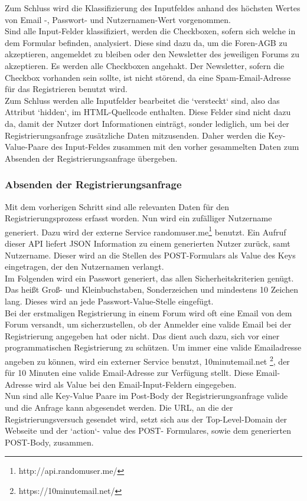Zum Schluss wird die Klassifizierung des Inputfeldes anhand des höchsten Wertes von Email -, Passwort- und Nutzernamen-Wert vorgenommen. \\
Sind alle Input-Felder klassifiziert, werden die Checkboxen, sofern sich welche in dem Formular befinden, analysiert. Diese sind dazu da, um die Foren-AGB zu akzeptieren, angemeldet zu bleiben oder den Newsletter des jeweiligen Forums zu akzeptieren.
Es werden alle Checkboxen angehakt. Der Newsletter, sofern die Checkbox vorhanden sein sollte, ist nicht störend, da eine Spam-Email-Adresse für das Registrieren benutzt wird.\\
Zum Schluss werden alle Inputfelder bearbeitet die `versteckt` sind, also das Attribut `hidden`, im HTML-Quellcode enthalten.
Diese Felder sind nicht dazu da, damit der Nutzer dort Informationen einträgt, sonder lediglich, um bei der Registrierungsanfrage zusätzliche Daten mitzusenden. Daher werden die Key-Value-Paare des Input-Feldes zusammen mit den vorher gesammelten Daten zum Absenden der Registrierungsanfrage übergeben.

\subsubsection{Absenden der Registrierungsanfrage}
Mit dem vorherigen Schritt sind alle relevanten Daten für den Registrierungsprozess erfasst worden. Nun wird ein zufälliger Nutzername generiert. Dazu wird der externe Service randomuser.me\footnote{http://api.randomuser.me/} benutzt. Ein Aufruf dieser API liefert JSON Information zu einem generierten Nutzer zurück, samt Nutzername. Dieser wird an die Stellen des POST-Formulars als Value des Keys eingetragen, der den Nutzernamen verlangt.\\
Im Folgenden wird ein Passwort generiert, das allen Sicherheitskriterien genügt. Das heißt Groß- und Kleinbuchstaben, Sonderzeichen und mindestens 10 Zeichen lang. Dieses wird an jede Passwort-Value-Stelle eingefügt.\\
Bei der erstmaligen Registrierung in einem Forum wird oft eine Email von dem Forum versandt, um sicherzustellen, ob der Anmelder eine valide Email bei der Registrierung angegeben hat oder nicht. Das dient auch dazu, sich vor einer programmatischen Registrierung zu schützen. Um immer eine valide Emailadresse angeben zu können, wird ein externer Service benutzt, 10minutemail.net \footnote{https://10minutemail.net/}, der für 10 Minuten eine valide Email-Adresse zur Verfügung stellt. Diese Email-Adresse wird als Value bei den Email-Input-Feldern eingegeben.\\
Nun sind alle Key-Value Paare im Post-Body der Registrierungsanfrage valide und die Anfrage kann abgesendet werden.
Die URL, an die der Registrierungsversuch gesendet wird, setzt sich aus der Top-Level-Domain der Webseite und der `action`- value des POST- Formulares, sowie dem generierten POST-Body, zusammen.

